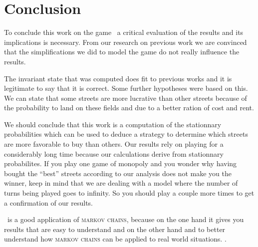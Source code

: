 \section{Conclusion} %
\label{sec:conclusion}

To conclude this work on the game \monopoly~a critical evaluation of the results and its 
implications is necessary. From our research on previous work we are convinced that the 
simplifications we did to model the game do not really influence the results. 

The invariant state that was computed does fit to previous works and it is legitimate to say 
that it is correct. Some further hypotheses were based on this. 
We can state that some streets are more lucrative than other streets because of the 
probability to land on these fields and due to a better ration of cost and rent.

We should conclude that this work is a computation of the stationnary probabilities which can 
be used to deduce a strategy to determine which streets are more favorable to buy than others.
Our results rely on playing for a considerably long time because our calculations derive from 
stationnary probabilites. If you play one game of monopoly and you wonder why having bought the ``best'' 
streets according to our analysis does not make you the winner, keep in mind that we are dealing 
with a model where the number of turns being played goes to infinity. So you should play a couple 
more times to get a confirmation of our results.

\monopoly~is a good application of \textsc{markov chains}, because on the one hand it gives you results
that are easy to understand and on the other hand and to better
understand how \textsc{markov chains} can be applied to real world situations.
. 

